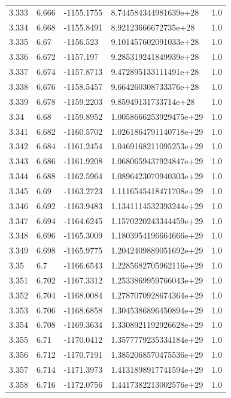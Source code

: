 \begin{tabular}{lllll}
3.333 & 6.666 & -1155.1755 & 8.744584344981639e+28 & 1.0 \\
3.334 & 6.668 & -1155.8491 & 8.92123666672735e+28 & 1.0 \\
3.335 & 6.67 & -1156.523 & 9.101457602091033e+28 & 1.0 \\
3.336 & 6.672 & -1157.197 & 9.285319241849939e+28 & 1.0 \\
3.337 & 6.674 & -1157.8713 & 9.472895133111491e+28 & 1.0 \\
3.338 & 6.676 & -1158.5457 & 9.664260308733376e+28 & 1.0 \\
3.339 & 6.678 & -1159.2203 & 9.85949131733714e+28 & 1.0 \\
3.34 & 6.68 & -1159.8952 & 1.0058666253929475e+29 & 1.0 \\
3.341 & 6.682 & -1160.5702 & 1.0261864791140718e+29 & 1.0 \\
3.342 & 6.684 & -1161.2454 & 1.0469168211095253e+29 & 1.0 \\
3.343 & 6.686 & -1161.9208 & 1.0680659437924847e+29 & 1.0 \\
3.344 & 6.688 & -1162.5964 & 1.0896423070940303e+29 & 1.0 \\
3.345 & 6.69 & -1163.2723 & 1.1116545418471708e+29 & 1.0 \\
3.346 & 6.692 & -1163.9483 & 1.1341114532393244e+29 & 1.0 \\
3.347 & 6.694 & -1164.6245 & 1.1570220243344459e+29 & 1.0 \\
3.348 & 6.696 & -1165.3009 & 1.1803954196664666e+29 & 1.0 \\
3.349 & 6.698 & -1165.9775 & 1.2042409889051692e+29 & 1.0 \\
3.35 & 6.7 & -1166.6543 & 1.2285682705962116e+29 & 1.0 \\
3.351 & 6.702 & -1167.3312 & 1.2533869959766043e+29 & 1.0 \\
3.352 & 6.704 & -1168.0084 & 1.2787070928674364e+29 & 1.0 \\
3.353 & 6.706 & -1168.6858 & 1.3045386896450894e+29 & 1.0 \\
3.354 & 6.708 & -1169.3634 & 1.3308921192926628e+29 & 1.0 \\
3.355 & 6.71 & -1170.0412 & 1.3577779235334184e+29 & 1.0 \\
3.356 & 6.712 & -1170.7191 & 1.3852068570475536e+29 & 1.0 \\
3.357 & 6.714 & -1171.3973 & 1.4131898917741594e+29 & 1.0 \\
3.358 & 6.716 & -1172.0756 & 1.4417382213002576e+29 & 1.0 \\

\end{tabular}
